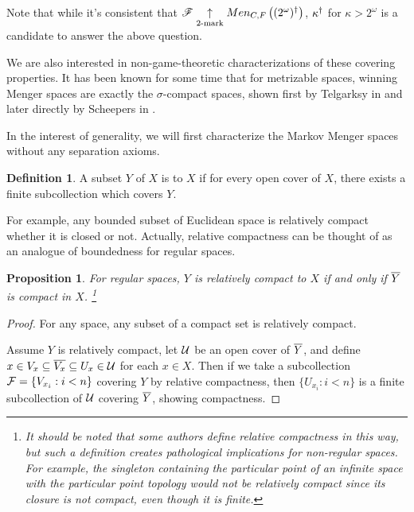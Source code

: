\documentclass{amsart}
\newtheorem{proposition}[theorem]{Proposition}
\theoremstyle{definition}
\newtheorem{definition}[theorem]{Definition}
\begin{document}
Note that while it's consistent that
\(\mathscr{F}\underset{2\text{-mark}}{\uparrow}Men_{C,F}\left({(2^\omega)^\dagger}\right)\), \(\kappa^\dagger\)
for \(\kappa>2^\omega\) is a candidate to answer the above question.

We are also interested in non-game-theoretic characterizations of these
covering properties. It has been known for some time that for metrizable spaces,
winning Menger spaces are exactly the \(\sigma\)-compact spaces, shown first
by Telgarksy in \cite{MR753073} and later directly by Scheepers in
\cite{MR1273523}.

In the interest of generality, we will first characterize the Markov Menger
spaces without any separation axioms.

\begin{definition}
  A subset \(Y\) of \(X\) is  to \(X\) if for every open
  cover of \(X\), there exists a finite subcollection which covers \(Y\).
\end{definition}

For example, any bounded subset of Euclidean space is relatively compact
whether it is closed or not. Actually, relative compactness can be thought
of as an analogue of boundedness for regular spaces.

\begin{proposition}
  For regular spaces, \(Y\) is relatively compact to \(X\) if and only if
  \(\overline{Y}\) is compact in \(X\).
  \footnote{
    It should be noted that some authors define relative compactness in
    this way, but such a definition creates pathological implications for
    non-regular spaces. For example, the singleton containing
    the particular point of an infinite space with the particular point topology
    would not be relatively compact since its closure is not compact, even
    though it is finite.
  }
\end{proposition}

\begin{proof}
  For any space, any subset of a compact set is relatively compact.

  Assume \(Y\) is relatively compact, let \(\mathcal{U}\) be an open cover of \(\overline{Y}\),
  and define \(x\in V_x\subseteq \overline{V_x}\subseteq U_x \in \mathcal{U}\) for each
  \(x\in X\). Then if we take a subcollection \(\mathcal{F} = \{V_{x_i} : i<n\}\) covering
  \(Y\) by relative compactness, then \(\{U_{x_i}:i<n\}\) is a finite subcollection
  of \(\mathcal{U}\) covering \(\overline{Y}\), showing compactness.
\end{proof}
\end{document}
